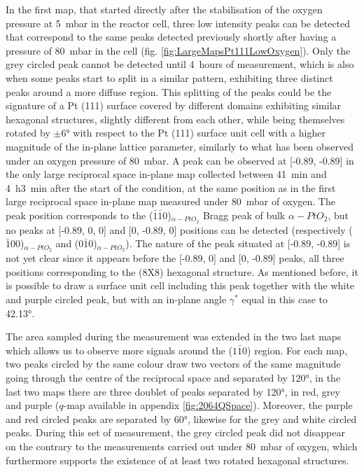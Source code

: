In the first map, that started directly after the stabilisation of the oxygen pressure at \qty{5}{\milli\bar} in the reactor cell, three low intensity peaks can be detected that correspond to the same peaks detected previously shortly after having a pressure of \qty{80}{\milli\bar} in the cell (fig. \ref{fig:LargeMapsPt111LowOxygen}).
Only the grey circled peak cannot be detected until \qty{4}{hours} of measurement, which is also when some peaks start to split in a similar pattern, exhibiting three distinct peaks around a more diffuse region.
This splitting of the peaks could be the signature of a Pt (111) surface covered by different domains exhibiting similar hexagonal structures, slightly different from each other, while being themselves rotated by $\pm \ang{6}$ with respect to the Pt (111) surface unit cell with a higher magnitude of the in-plane lattice parameter, similarly to what has been observed under an oxygen pressure of \qty{80}{\milli\bar}.
A peak can be observed at [-0.89, -0.89] in the only large reciprocal space in-plane map collected between \qty{41}{\minute} and \qty{4}{\hour}\qty{3}{\minute} after the start of the condition, at the same position as in the first large reciprocal space in-plane map measured under \qty{80}{\milli\bar} of oxygen.
The peak position corresponds to the ($\bar{1}\bar{1}0$)$_{\alpha-PtO_2}$ Bragg peak of bulk $\alpha-PtO_2$, but no peaks at [-0.89, 0, 0] and [0, -0.89, 0] positions can be detected (respectively ($\bar{1}00$)$_{\alpha-PtO_2}$ and ($0\bar{1}0$)$_{\alpha-PtO_2}$).
The nature of the peak situated at [-0.89, -0.89] is not yet clear since it appears before the [-0.89, 0] and [0, -0.89] peaks, all three positions corresponding to the (8X8) hexagonal structure.
As mentioned before, it is possible to draw a surface unit cell including this peak together with the white and purple circled peak, but with an in-plane angle $\gamma^*$ equal in this case to \ang{42.13}.

The area sampled during the measurement was extended in the two last maps which allows us to observe more signals around the ($1\bar{1}0$) region.
For each map, two peaks circled by the same colour draw two vectors of the same magnitude going through the centre of the reciprocal space and separated by \ang{120}, in the last two maps there are three doublet of peaks separated by \ang{120}, in red, grey and purple ($q$-map available in appendix \ref{fig:2064QSpace}).
Moreover, the purple and red circled peaks are separated by \ang{60}, likewise for the grey and white circled peaks.
During this set of measurement, the grey circled peak did not disappear on the contrary to the measurements carried out under \qty{80}{\milli\bar} of oxygen, which furthermore supports the existence of at least two rotated hexagonal structures.

